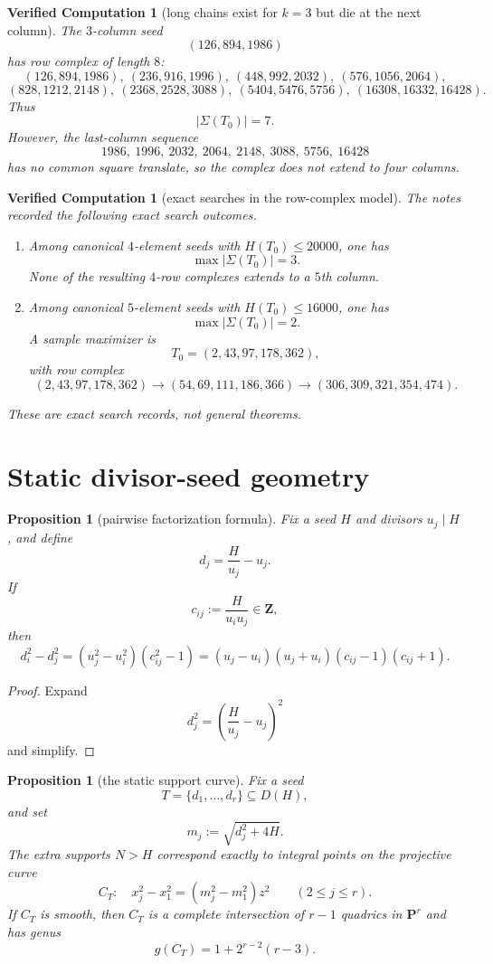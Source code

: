 \documentclass[11pt]{article}
\theoremstyle{plainbreak}
\newtheorem{proposition}[theorem]{Proposition}
\theoremstyle{defbreak}
\newtheorem{computation}[theorem]{Verified Computation}
\newcommand{\Dset}{D}
\newcommand{\Z}{\mathbf{Z}}
\newcommand{\PP}{\mathbf{P}}
\begin{document}
\begin{computation}[long chains exist for $k=3$ but die at the next column]
The $3$-column seed
\[
(126,894,1986)
\]
has row complex of length $8$:
\[
(126,894,1986),
\ (236,916,1996),
\ (448,992,2032),
\ (576,1056,2064),
\]
\[
(828,1212,2148),
\ (2368,2528,3088),
\ (5404,5476,5756),
\ (16308,16332,16428).
\]
Thus
\[
|\Sigma(T_0)|=7.
\]
However, the last-column sequence
\[
1986,\ 1996,\ 2032,\ 2064,\ 2148,\ 3088,\ 5756,\ 16428
\]
has no common square translate, so the complex does not extend to four columns.
\end{computation}

\begin{computation}[exact searches in the row-complex model]
The notes recorded the following exact search outcomes.
\begin{enumerate}[label=\textup{(\roman*)}]
    \item Among canonical $4$-element seeds with $H(T_0)\le 20000$, one has
    \[
    \max |\Sigma(T_0)|=3.
    \]
    None of the resulting $4$-row complexes extends to a $5$th column.
    \item Among canonical $5$-element seeds with $H(T_0)\le 16000$, one has
    \[
    \max |\Sigma(T_0)|=2.
    \]
    A sample maximizer is
    \[
    T_0=(2,43,97,178,362),
    \]
    with row complex
    \[
    (2,43,97,178,362)\to (54,69,111,186,366)\to (306,309,321,354,474).
    \]
\end{enumerate}
These are exact search records, not general theorems.
\end{computation}

\section{Static divisor-seed geometry}

\begin{proposition}[pairwise factorization formula]
Fix a seed $H$ and divisors $u_j\mid H$, and define
\[
d_j=\frac{H}{u_j}-u_j.
\]
If
\[
c_{ij}:=\frac{H}{u_i u_j}\in \Z,
\]
then
\[
d_i^2-d_j^2
=
(u_j^2-u_i^2)(c_{ij}^2-1)
=
(u_j-u_i)(u_j+u_i)(c_{ij}-1)(c_{ij}+1).
\]
\end{proposition}

\begin{proof}
Expand
\[
d_j^2=\left(\frac{H}{u_j}-u_j\right)^2
\]
and simplify.
\end{proof}

\begin{proposition}[the static support curve]
Fix a seed
\[
T=\{d_1,\dots,d_r\}\subseteq \Dset(H),
\]
and set
\[
m_j:=\sqrt{d_j^2+4H}.
\]
The extra supports $N>H$ correspond exactly to integral points on the projective curve
\[
C_T:\quad x_j^2-x_1^2=(m_j^2-m_1^2)z^2\qquad (2\le j\le r).
\]
If $C_T$ is smooth, then $C_T$ is a complete intersection of $r-1$ quadrics in $\PP^r$ and has genus
\[
g(C_T)=1+2^{r-2}(r-3).
\]
\end{proposition}
\end{document}
